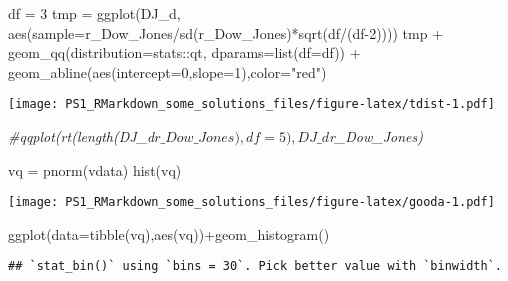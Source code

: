 \documentclass[
]{article}
\newenvironment{Shaded}{\begin{snugshade}}{\end{snugshade}}
\newcommand{\AttributeTok}[1]{\textcolor[rgb]{0.77,0.63,0.00}{#1}}
\newcommand{\CommentTok}[1]{\textcolor[rgb]{0.56,0.35,0.01}{\textit{#1}}}
\newcommand{\DecValTok}[1]{\textcolor[rgb]{0.00,0.00,0.81}{#1}}
\newcommand{\FunctionTok}[1]{\textcolor[rgb]{0.00,0.00,0.00}{#1}}
\newcommand{\NormalTok}[1]{#1}
\newcommand{\OtherTok}[1]{\textcolor[rgb]{0.56,0.35,0.01}{#1}}
\newcommand{\SpecialCharTok}[1]{\textcolor[rgb]{0.00,0.00,0.00}{#1}}
\newcommand{\StringTok}[1]{\textcolor[rgb]{0.31,0.60,0.02}{#1}}
\begin{document}
\begin{Shaded}
\begin{Highlighting}[]
\NormalTok{df }\OtherTok{=} \DecValTok{3}
\NormalTok{tmp }\OtherTok{=} \FunctionTok{ggplot}\NormalTok{(DJ\_d, }\FunctionTok{aes}\NormalTok{(}\AttributeTok{sample=}\NormalTok{r\_Dow\_Jones}\SpecialCharTok{/}\FunctionTok{sd}\NormalTok{(r\_Dow\_Jones)}\SpecialCharTok{*}\FunctionTok{sqrt}\NormalTok{(df}\SpecialCharTok{/}\NormalTok{(df}\DecValTok{{-}2}\NormalTok{))))}
\NormalTok{tmp }\SpecialCharTok{+} \FunctionTok{geom\_qq}\NormalTok{(}\AttributeTok{distribution=}\NormalTok{stats}\SpecialCharTok{::}\NormalTok{qt, }\AttributeTok{dparams=}\FunctionTok{list}\NormalTok{(}\AttributeTok{df=}\NormalTok{df)) }\SpecialCharTok{+} \FunctionTok{geom\_abline}\NormalTok{(}\FunctionTok{aes}\NormalTok{(}\AttributeTok{intercept=}\DecValTok{0}\NormalTok{,}\AttributeTok{slope=}\DecValTok{1}\NormalTok{),}\AttributeTok{color=}\StringTok{"red"}\NormalTok{)}
\end{Highlighting}
\end{Shaded}

\texttt{[image: PS1\_RMarkdown\_some\_solutions\_files/figure-latex/tdist-1.pdf]}

\begin{Shaded}
\begin{Highlighting}[]
\CommentTok{\#qqplot(rt(length(DJ\_d$r\_Dow\_Jones),df=5),DJ\_d$r\_Dow\_Jones)}
\end{Highlighting}
\end{Shaded}

\begin{Shaded}
\begin{Highlighting}[]
\NormalTok{vq }\OtherTok{=} \FunctionTok{pnorm}\NormalTok{(vdata)}
\FunctionTok{hist}\NormalTok{(vq)}
\end{Highlighting}
\end{Shaded}

\texttt{[image: PS1\_RMarkdown\_some\_solutions\_files/figure-latex/gooda-1.pdf]}

\begin{Shaded}
\begin{Highlighting}[]
\FunctionTok{ggplot}\NormalTok{(}\AttributeTok{data=}\FunctionTok{tibble}\NormalTok{(vq),}\FunctionTok{aes}\NormalTok{(vq))}\SpecialCharTok{+}\FunctionTok{geom\_histogram}\NormalTok{()}
\end{Highlighting}
\end{Shaded}

\begin{verbatim}
## `stat_bin()` using `bins = 30`. Pick better value with `binwidth`.
\end{verbatim}
\end{document}
